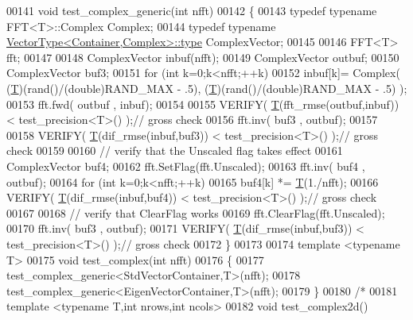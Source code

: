\begin{DoxyCode}
00141 \textcolor{keywordtype}{void} test\_complex\_generic(\textcolor{keywordtype}{int} nfft)
00142 \{
00143     \textcolor{keyword}{typedef} \textcolor{keyword}{typename} FFT<T>::Complex Complex;
00144     \textcolor{keyword}{typedef} \textcolor{keyword}{typename} \hyperlink{struct_vector_type}{VectorType<Container,Complex>::type} ComplexVector;
00145 
00146     FFT<T> fft;
00147 
00148     ComplexVector inbuf(nfft);
00149     ComplexVector outbuf;
00150     ComplexVector buf3;
00151     \textcolor{keywordflow}{for} (\textcolor{keywordtype}{int} k=0;k<nfft;++k)
00152         inbuf[k]= Complex( (\hyperlink{group___sparse_core___module_class_eigen_1_1_triplet}{T})(rand()/(\textcolor{keywordtype}{double})RAND\_MAX - .5), (\hyperlink{group___sparse_core___module_class_eigen_1_1_triplet}{T})(rand()/(\textcolor{keywordtype}{double})RAND\_MAX - .5) );
00153     fft.fwd( outbuf , inbuf);
00154 
00155     VERIFY( \hyperlink{group___sparse_core___module_class_eigen_1_1_triplet}{T}(fft\_rmse(outbuf,inbuf)) < test\_precision<T>()  );\textcolor{comment}{// gross check}
00156     fft.inv( buf3 , outbuf);
00157 
00158     VERIFY( \hyperlink{group___sparse_core___module_class_eigen_1_1_triplet}{T}(dif\_rmse(inbuf,buf3)) < test\_precision<T>()  );\textcolor{comment}{// gross check}
00159 
00160     \textcolor{comment}{// verify that the Unscaled flag takes effect}
00161     ComplexVector buf4;
00162     fft.SetFlag(fft.Unscaled);
00163     fft.inv( buf4 , outbuf);
00164     \textcolor{keywordflow}{for} (\textcolor{keywordtype}{int} k=0;k<nfft;++k)
00165         buf4[k] *= \hyperlink{group___sparse_core___module_class_eigen_1_1_triplet}{T}(1./nfft);
00166     VERIFY( \hyperlink{group___sparse_core___module_class_eigen_1_1_triplet}{T}(dif\_rmse(inbuf,buf4)) < test\_precision<T>()  );\textcolor{comment}{// gross check}
00167 
00168     \textcolor{comment}{// verify that ClearFlag works}
00169     fft.ClearFlag(fft.Unscaled);
00170     fft.inv( buf3 , outbuf);
00171     VERIFY( \hyperlink{group___sparse_core___module_class_eigen_1_1_triplet}{T}(dif\_rmse(inbuf,buf3)) < test\_precision<T>()  );\textcolor{comment}{// gross check}
00172 \}
00173 
00174 \textcolor{keyword}{template} <\textcolor{keyword}{typename} T>
00175 \textcolor{keywordtype}{void} test\_complex(\textcolor{keywordtype}{int} nfft)
00176 \{
00177   test\_complex\_generic<StdVectorContainer,T>(nfft);
00178   test\_complex\_generic<EigenVectorContainer,T>(nfft);
00179 \}
00180 \textcolor{comment}{/*}
00181 \textcolor{comment}{template <typename T,int nrows,int ncols>}
00182 \textcolor{comment}{void test\_complex2d()}

\end{DoxyCode}
